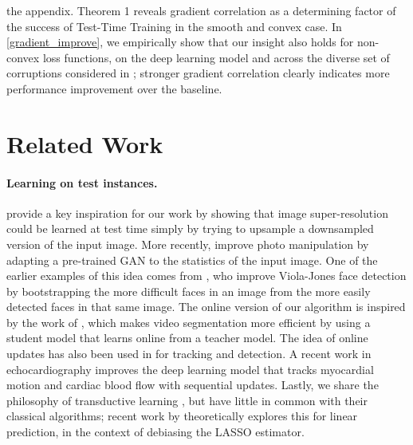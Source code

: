 \documentclass{article}
\theoremstyle{plain}
\theoremstyle{remark}
\theoremstyle{definition}
\begin{document}
the appendix.  Theorem 1 reveals gradient correlation as a determining factor of the success of Test-Time Training in the smooth and convex case.
In \autoref{gradient_improve}, we empirically show that our insight also holds for non-convex loss functions,
on the deep learning model and across the diverse set of corruptions considered in ; stronger gradient correlation clearly indicates more performance improvement over the baseline.

\section{Related Work}
\label{related}

\paragraph{Learning on test instances.}
\citet{shocher2018zero} provide a key inspiration for our work by showing that image super-resolution could be learned at test time simply by trying to upsample a downsampled version of the input image. More recently, \citet{bau2019semantic} improve photo manipulation by adapting a pre-trained GAN to the statistics of the input image.   One of the earlier examples of this idea comes from \citet{jain2011online}, who improve Viola-Jones face detection \citep{viola2001rapid} by bootstrapping the more difficult faces in an image from the more easily detected faces in that same image. 
The online version of our algorithm is inspired by the work of \citet{mullapudi2018online}, which makes video segmentation more efficient by using a student model that learns online from a teacher model.
The idea of online updates has also been used in \citet{kalal2011tracking} for tracking and detection.
A recent work in echocardiography \citep{zhu2019neural} improves the deep learning model that tracks myocardial motion and cardiac blood flow with sequential updates.
Lastly, we share the philosophy of transductive learning \citep{vapnik2013nature, gammerman1998learning}, but have little in common with their classical algorithms;
recent work by \citet{nilesh} theoretically explores this for linear prediction, in the context of debiasing the LASSO estimator.
\end{document}
